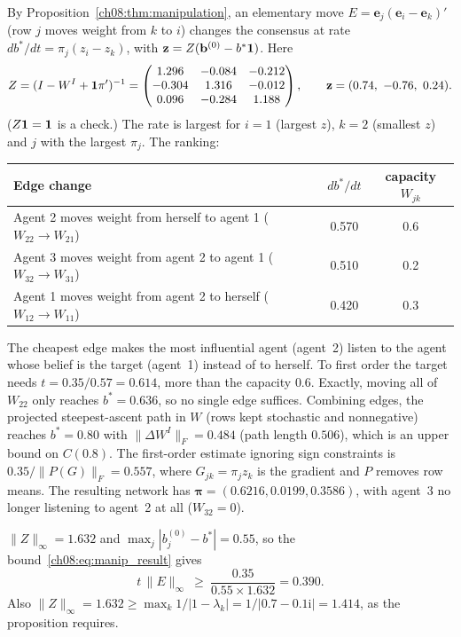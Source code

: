 \documentclass[../solutions_manual.tex]{subfiles}
\begin{document}
 By Proposition~\ref{ch08:thm:manipulation}, an elementary move $E = \mathbf{e}_j(\mathbf{e}_i - \mathbf{e}_k)'$ (row $j$ moves weight from $k$ to $i$) changes the consensus at rate $db^*/dt = \pi_j(z_i - z_k)$, with $\mathbf{z} = Z(\mathbf{b}^{(0)} - b^*\mathbf{1})$. Here
\[
Z = (I - W^I + \mathbf{1}\pi')^{-1} = \begin{pmatrix} 1.296 & -0.084 & -0.212 \\ -0.304 & 1.316 & -0.012 \\ 0.096 & -0.284 & 1.188\end{pmatrix}, \qquad \mathbf{z} = (0.74,\ -0.76,\ 0.24).
\]
($Z\mathbf{1} = \mathbf{1}$ is a check.) The rate is largest for $i = 1$ (largest $z$), $k = 2$ (smallest $z$) and $j$ with the largest $\pi_j$. The ranking:
\begin{center}
\small
\begin{tabular}{lcc}
\toprule
Edge change & $db^*/dt$ & capacity $W_{jk}$ \\
\midrule
Agent 2 moves weight from herself to agent 1 ($W_{22} \to W_{21}$) & 0.570 & 0.6 \\
Agent 3 moves weight from agent 2 to agent 1 ($W_{32} \to W_{31}$) & 0.510 & 0.2 \\
Agent 1 moves weight from agent 2 to herself ($W_{12} \to W_{11}$) & 0.420 & 0.3 \\
\bottomrule
\end{tabular}
\end{center}
The cheapest edge makes the most influential agent (agent~2) listen to the agent whose belief is the target (agent~1) instead of to herself. To first order the target needs $t = 0.35/0.57 = 0.614$, more than the capacity $0.6$. Exactly, moving all of $W_{22}$ only reaches $b^* = 0.636$, so no single edge suffices. Combining edges, the projected steepest-ascent path in $W$ (rows kept stochastic and nonnegative) reaches $b^* = 0.80$ with $\|\Delta W^I\|_F = 0.484$ (path length $0.506$), which is an upper bound on $C(0.8)$. The first-order estimate ignoring sign constraints is $0.35/\|P(G)\|_F = 0.557$, where $G_{jk} = \pi_jz_k$ is the gradient and $P$ removes row means. The resulting network has $\boldsymbol{\pi} = (0.6216, 0.0199, 0.3586)$, with agent~3 no longer listening to agent~2 at all ($W_{32} = 0$).

 $\|Z\|_\infty = 1.632$ and $\max_j|b_j^{(0)} - b^*| = 0.55$, so the bound~\eqref{ch08:eq:manip_result} gives
\[
t\,\|E\|_\infty \ \ge\ \frac{0.35}{0.55 \times 1.632} = 0.390 .
\]
Also $\|Z\|_\infty = 1.632 \ge \max_k 1/|1 - \lambda_k| = 1/|0.7 - 0.1\mathrm{i}| = 1.414$, as the proposition requires.
\end{document}

